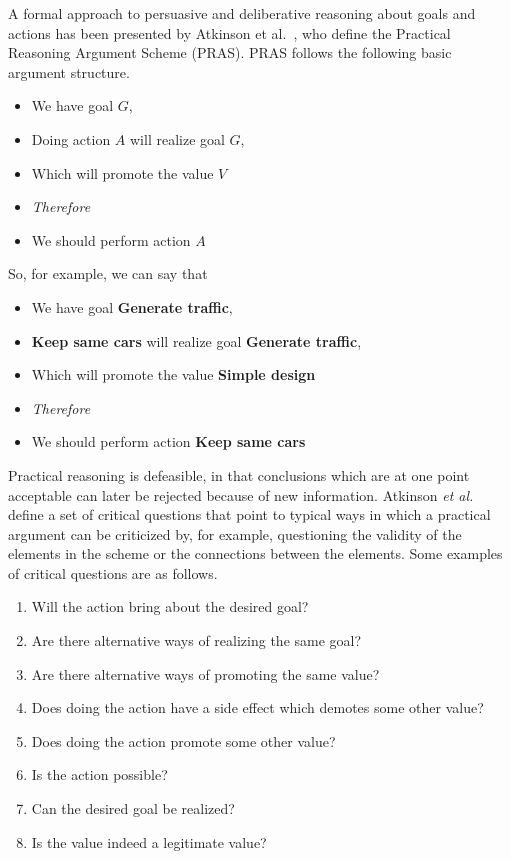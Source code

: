 A formal approach to persuasive and deliberative reasoning about goals and actions has been presented by Atkinson et al.~\cite{atkinson2007}, who define the Practical Reasoning Argument Scheme (PRAS). PRAS follows the following basic argument structure. 

\begin{itemize}
\item[] We have goal $G$,
\item[] Doing action $A$ will realize goal $G$,
\item[] Which will promote the value $V$
\item[] \textit{Therefore} 
\item[] We should perform action $A$
\end{itemize}

So, for example, we can say that 
\begin{itemize}
\item[] We have goal \textbf{Generate traffic},
\item[] \textbf{Keep same cars} will realize goal \textbf{Generate traffic},
\item[] Which will promote the value \textbf{Simple design}
\item[] \textit{Therefore} 
\item[] We should perform action \textbf{Keep same cars}
\end{itemize}

Practical reasoning is defeasible, in that conclusions which are at one point acceptable can later be rejected because of new information. Atkinson \emph{et al.}~\cite{atkinson2007} define a set of critical questions that point to typical ways in which a practical argument can be criticized by, for example, questioning the validity of the elements in the scheme or the connections between the elements. Some examples of critical questions are as follows.

\begin{enumerate}
\item Will the action bring about the desired goal?
\item Are there alternative ways of realizing the same goal?
\item Are there alternative ways of promoting the same value?
\item Does doing the action have a side effect which demotes some other value?
\item Does doing the action promote some other value?
\item Is the action possible?
\item Can the desired goal be realized?
\item Is the value indeed a legitimate value?
\end{enumerate}

